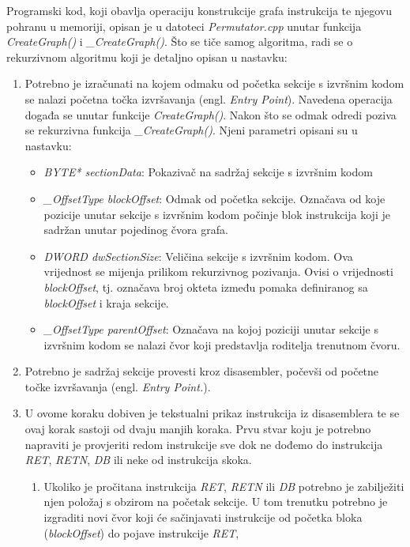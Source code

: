 \documentclass[times, utf8, diplomski, numeric]{fer}
\begin{document}
Programski kod, koji obavlja operaciju konstrukcije grafa instrukcija te
njegovu pohranu u memoriji, opisan je u datoteci \emph{Permutator.cpp} unutar
funkcija \emph{CreateGraph()} i \emph{\_CreateGraph()}. Što se tiče samog
algoritma, radi se o rekurzivnom algoritmu koji je detaljno opisan u nastavku:

\begin{enumerate}
\item Potrebno je izračunati na kojem odmaku od početka sekcije s izvršnim
kodom se nalazi početna točka izvršavanja (engl. \emph{Entry Point}). Navedena
operacija događa se unutar funkcije \emph{CreateGraph()}. Nakon što se odmak
odredi poziva se rekurzivna funkcija \emph{\_CreateGraph()}. Njeni parametri
opisani su u nastavku:
\begin{itemize}
\item \emph{BYTE* sectionData}: Pokazivač na sadržaj sekcije s izvršnim kodom
\item \emph{\_OffsetType blockOffset}: Odmak od početka sekcije. Označava od
koje pozicije unutar sekcije s izvršnim kodom počinje blok instrukcija koji je
sadržan unutar pojedinog čvora grafa.
\item \emph{DWORD dwSectionSize}: Veličina sekcije s izvršnim kodom. Ova
vrijednost se mijenja prilikom rekurzivnog pozivanja. Ovisi o vrijednosti
\emph{blockOffset}, tj. označava broj okteta između pomaka definiranog sa
\emph{blockOffset} i kraja sekcije.
\item \emph{\_OffsetType parentOffset}: Označava na kojoj poziciji unutar
sekcije s izvršnim kodom se nalazi čvor koji predstavlja roditelja trenutnom
čvoru.
\end{itemize} 
\item Potrebno je sadržaj sekcije provesti kroz disasembler, počevši od početne
točke izvršavanja (engl. \emph{Entry Point.}).
\item U ovome koraku dobiven je tekstualni prikaz instrukcija iz disasemblera
te se ovaj korak sastoji od dvaju manjih koraka. Prvu stvar koju je potrebno
napraviti je provjeriti redom instrukcije sve dok ne dođemo do instrukcija
\emph{RET}, \emph{RETN}, \emph{DB} ili neke od instrukcija skoka.
\begin{enumerate}
\item Ukoliko je pročitana instrukcija \emph{RET}, \emph{RETN} ili \emph{DB}
potrebno je zabilježiti njen položaj s obzirom na početak sekcije. U tom
trenutku potrebno je izgraditi novi čvor koji će sačinjavati instrukcije od
početka bloka (\emph{blockOffset}) do pojave instrukcije \emph{RET},

\end{enumerate}
\end{enumerate}
\end{document}
